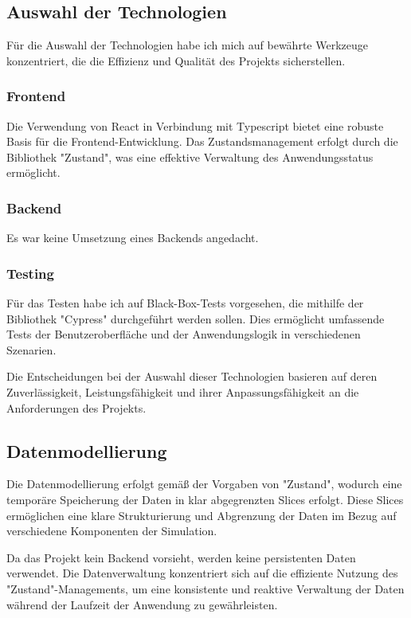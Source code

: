 \documentclass[hidelinks,12pt]{article}
\begin{document}
\subsection{Auswahl der Technologien}
Für die Auswahl der Technologien habe ich mich auf bewährte Werkzeuge konzentriert, die die Effizienz und Qualität des Projekts sicherstellen.

\subsubsection{Frontend}
Die Verwendung von React in Verbindung mit Typescript bietet eine robuste Basis für die Frontend-Entwicklung. Das Zustandsmanagement erfolgt durch die Bibliothek "Zustand", was eine effektive Verwaltung des Anwendungsstatus ermöglicht.

\subsubsection{Backend}
Es war keine Umsetzung eines Backends angedacht.

\subsubsection{Testing}
Für das Testen habe ich auf Black-Box-Tests vorgesehen, die mithilfe der Bibliothek "Cypress" durchgeführt werden sollen. Dies ermöglicht umfassende Tests der Benutzeroberfläche und der Anwendungslogik in verschiedenen Szenarien.

Die Entscheidungen bei der Auswahl dieser Technologien basieren auf deren Zuverlässigkeit, Leistungsfähigkeit und ihrer Anpassungsfähigkeit an die Anforderungen des Projekts.

\subsection{Datenmodellierung}
Die Datenmodellierung erfolgt gemäß der Vorgaben von "Zustand", wodurch eine temporäre Speicherung der Daten in klar abgegrenzten Slices erfolgt. Diese Slices ermöglichen eine klare Strukturierung und Abgrenzung der Daten im Bezug auf verschiedene Komponenten der Simulation.

Da das Projekt kein Backend vorsieht, werden keine persistenten Daten verwendet. Die Datenverwaltung konzentriert sich auf die effiziente Nutzung des "Zustand"-Managements, um eine konsistente und reaktive Verwaltung der Daten während der Laufzeit der Anwendung zu gewährleisten.
\end{document}
